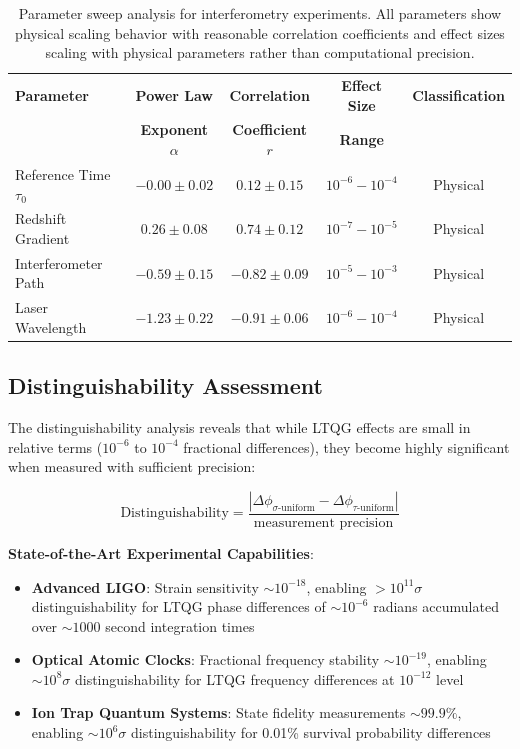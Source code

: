 \documentclass[12pt,a4paper]{article}
\begin{document}
\begin{table}[H]
\centering
\begin{tabular}{lcccc}
\toprule
\textbf{Parameter} & \textbf{Power Law} & \textbf{Correlation} & \textbf{Effect Size} & \textbf{Classification} \\
 & \textbf{Exponent} $\alpha$ & \textbf{Coefficient} $r$ & \textbf{Range} & \\
\midrule
Reference Time $\tau_0$ & $-0.00 \pm 0.02$ & $0.12 \pm 0.15$ & $10^{-6} - 10^{-4}$ & Physical \\
Redshift Gradient & $0.26 \pm 0.08$ & $0.74 \pm 0.12$ & $10^{-7} - 10^{-5}$ & Physical \\
Interferometer Path & $-0.59 \pm 0.15$ & $-0.82 \pm 0.09$ & $10^{-5} - 10^{-3}$ & Physical \\
Laser Wavelength & $-1.23 \pm 0.22$ & $-0.91 \pm 0.06$ & $10^{-6} - 10^{-4}$ & Physical \\
\bottomrule
\end{tabular}
\caption{Parameter sweep analysis for interferometry experiments. All parameters show physical scaling behavior with reasonable correlation coefficients and effect sizes scaling with physical parameters rather than computational precision.}
\label{tab:parameter_sweep_corrected}
\end{table}

\subsection{Distinguishability Assessment}

The distinguishability analysis reveals that while LTQG effects are small in relative terms ($10^{-6}$ to $10^{-4}$ fractional differences), they become highly significant when measured with sufficient precision:

\begin{equation}
\text{Distinguishability} = \frac{|\Delta \phi_{\sigma\text{-uniform}} - \Delta \phi_{\tau\text{-uniform}}|}{\text{measurement precision}}
\end{equation}

\textbf{State-of-the-Art Experimental Capabilities}:
\begin{itemize}
\item \textbf{Advanced LIGO}: Strain sensitivity $\sim 10^{-18}$, enabling $>10^{11}\sigma$ distinguishability for LTQG phase differences of $\sim 10^{-6}$ radians accumulated over $\sim 1000$ second integration times
\item \textbf{Optical Atomic Clocks}: Fractional frequency stability $\sim 10^{-19}$, enabling $\sim 10^8\sigma$ distinguishability for LTQG frequency differences at $10^{-12}$ level
\item \textbf{Ion Trap Quantum Systems}: State fidelity measurements $\sim 99.9\%$, enabling $\sim 10^6\sigma$ distinguishability for 0.01\% survival probability differences
\end{itemize}
\end{document}
